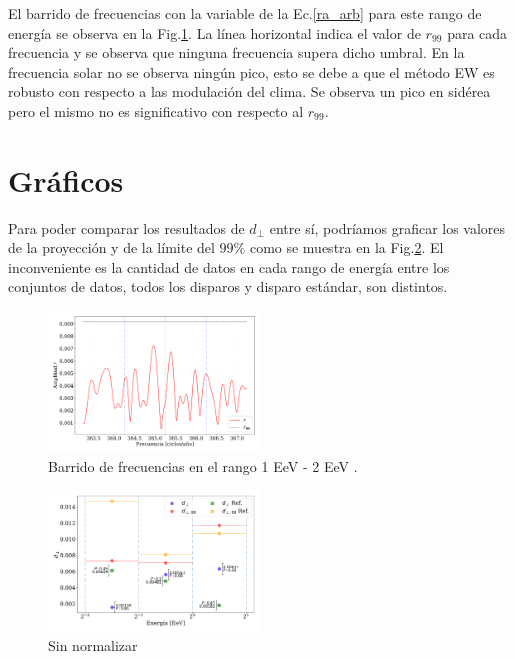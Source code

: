     El barrido de frecuencias con la variable de la Ec.\ref{ra_arb} para este rango de energía se observa en la Fig.\ref{fig:tercer_barrido}. La línea horizontal indica el valor de $r_{99}$ para cada frecuencia y se observa que ninguna frecuencia supera dicho umbral. En la frecuencia solar no se observa ningún pico, esto se debe a que el método EW es robusto con respecto a las modulación del clima. Se observa un pico en sidérea pero el mismo no es significativo con respecto al $r_{99}$.

    \section*{Gráficos}

    Para poder comparar los resultados de $d_\perp$ entre sí, podríamos graficar los valores de la proyección y de la límite del $99\%$ como se muestra en la Fig.\ref{fig:no_normalizado}. El inconveniente es la cantidad de datos en cada rango de energía entre los conjuntos de datos, todos los disparos y disparo estándar, son distintos.

    \begin{figure}[H]
        \begin{small}
            \begin{center}
                \includegraphics[width=0.5\textwidth]{plot_bin_3_barrido_v2.pdf}
            \end{center}
            \caption{Barrido de frecuencias en el  rango 1 EeV - 2 EeV .}
            \label{fig:tercer_barrido}
        \end{small}
    \end{figure}    


    \begin{figure}[H]
        \begin{small}
            \begin{center}
                \includegraphics[width=0.5\textwidth]{d_perp_no_normalizado_v2.pdf}
            \end{center}
            \caption{Sin normalizar}
            \label{fig:no_normalizado}
        \end{small}
    \end{figure}
    
